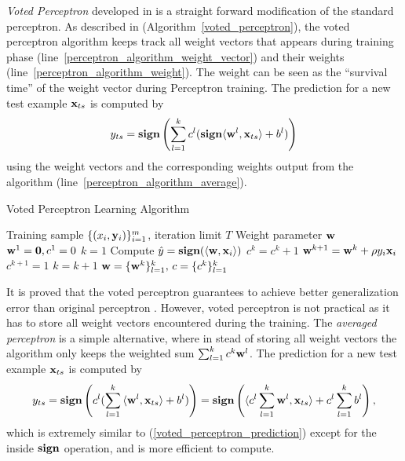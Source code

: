 {\textit{Voted Perceptron} developed in \citep{Freund99large} is a straight forward modification of the standard perceptron.
As described in (Algorithm~\ref{voted_perceptron}), the voted perceptron algorithm keeps track all weight vectors that appears during training phase (line~\ref{perceptron_algorithm_weight_vector}) and their weights (line~\ref{perceptron_algorithm_weight}).
The weight can be seen as the ``survival time'' of the weight vector during Perceptron training.
The prediction for a new test example $\mathbf {x}_{ts}$ is computed by 
\begin{align}
	y_{ts} = \textbf{sign}\left({\sum_{l=1}^{k}c^l(\textbf{sign}{\langle \mathbf {w}^l, \mathbf {x}_{ts} \rangle+b^{l}}})\right) \label{voted_perceptron_prediction}
\end{align}
using the weight vectors and the corresponding weights output from the algorithm (line~\ref{perceptron_algorithm_average}).
\begin{algorithm}
\caption{Voted Perceptron Learning Algorithm}
\label{voted_perceptron}
\begin{algorithmic}[1]
	\REQUIRE Training sample $\lbrace (x_i,\mathbf {y}_i)\rbrace_{i=1}^m$, iteration limit $T$
	\ENSURE Weight parameter $\mathbf {w}$
	\STATE $\mathbf {w}^{1}=\mathbf {0},c^1=0$
	\STATE $k=1$
			\STATE Compute $\hat{y} = \textbf{sign}(\langle \mathbf {w}, \mathbf {x}_i \rangle)$
				\STATE $c^k = c^k + 1$
			\ELSE
				\STATE $\mathbf {w}^{k+1} = \mathbf {w}^{k} + \rho y_i\mathbf {x}_i$ \label{perceptron_algorithm_weight_vector}
				\STATE $c^{k+1} =1$ \label{perceptron_algorithm_weight}
				\STATE $k=k+1$
			\ENDIF
		\ENDFOR
	\ENDFOR
	\RETURN $\mathbf {w} = \{\mathbf {w}^{k}\}_{l=1}^{k},\,c = \{c^{k}\}_{l=1}^{k}$ \label{perceptron_algorithm_average}
\end{algorithmic}
\end{algorithm}

It is proved that the voted perceptron guarantees to achieve better generalization error than original perceptron \citep{Rosenblatt58,Rosenblatt62}.
However, voted perceptron is not practical as it has to store all weight vectors encountered during the training.
The \textit{averaged perceptron} is a simple alternative, where in stead of storing all weight vectors the algorithm only keeps the weighted sum $\sum_{l=1}^{k}c^k\mathbf {w}^l$. 
The prediction for a new test example $\mathbf {x}_{ts}$ is computed by 
\begin{align*}
	y_{ts} = \textbf{sign}\left(c^l({\sum_{l=1}^{k}{\langle \mathbf {w}^l, \mathbf {x}_{ts} \rangle+b^{l}}})\right) = \textbf{sign}\left({{\langle c^l\sum_{l=1}^{k}\mathbf {w}^l, \mathbf {x}_{ts} \rangle+c^l\sum_{l=1}^{k}b^{l}}}\right),
\end{align*}
which is extremely similar to (\ref{voted_perceptron_prediction}) except for the inside $\textbf{sign}$ operation, and is more efficient to compute.

}
